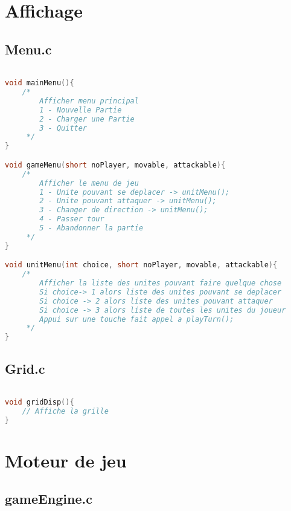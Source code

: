 \documentclass[a4paper,10pt]{extreport}
\begin{document}
\part{Affichage}

\chapter{Menu.c}
\vspace{-1cm}

\begin{lstlisting}[language=c]

void mainMenu(){
	/*
		Afficher menu principal
		1 - Nouvelle Partie
		2 - Charger une Partie
		3 - Quitter
	 */
}

void gameMenu(short noPlayer, movable, attackable){
	/*
		Afficher le menu de jeu
		1 - Unite pouvant se deplacer -> unitMenu();
		2 - Unite pouvant attaquer -> unitMenu();
		3 - Changer de direction -> unitMenu();
		4 - Passer tour
		5 - Abandonner la partie
	 */
}

void unitMenu(int choice, short noPlayer, movable, attackable){
	/*
		Afficher la liste des unites pouvant faire quelque chose
		Si choice-> 1 alors liste des unites pouvant se deplacer
		Si choice -> 2 alors liste des unites pouvant attaquer
		Si choice -> 3 alors liste de toutes les unites du joueur
		Appui sur une touche fait appel a playTurn();
	 */
}
\end{lstlisting}

\chapter{Grid.c}
\vspace{-1cm}

\begin{lstlisting}[language=c]

void gridDisp(){
	// Affiche la grille
}

\end{lstlisting}

\part{Moteur de jeu}

\chapter{gameEngine.c}
\vspace{-1cm}
\end{document}
